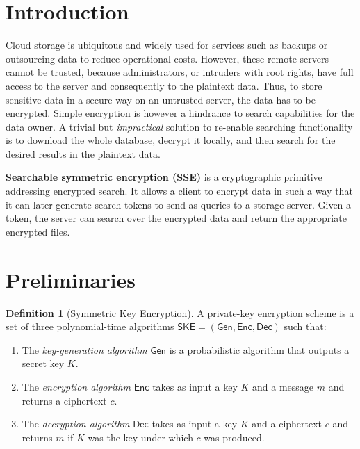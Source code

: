 \documentclass[12pt,a4paper]{article}
\theoremstyle{definition}
\newtheorem{definition}{Definition}
\begin{document}





\tableofcontents
\clearpage

\section{Introduction}

Cloud storage is ubiquitous and widely used for services such as backups or
outsourcing data to reduce operational costs. However, these remote servers
cannot be trusted, because administrators, or intruders with root rights, have
full access to the server and consequently to the plaintext data. Thus, to
store sensitive data in a secure way on an untrusted server, the data has to be
encrypted. Simple encryption is however a hindrance to search capabilities for
the data owner. A trivial but \emph{impractical} solution to re-enable
searching functionality is to download the whole database, decrypt it locally,
and then search for the desired results in the plaintext data.

\textbf{Searchable symmetric encryption (SSE)} is a cryptographic primitive
addressing encrypted search. It allows a client to encrypt data in such a
way that it can later generate search tokens to send as queries to a storage
server. Given a token, the server can search over the encrypted data and return
the appropriate encrypted files.
\clearpage

\section{Preliminaries}

\begin{definition}[Symmetric Key Encryption]
A private-key encryption scheme is a set of three polynomial-time algorithms
\(\mathsf{SKE = (Gen, Enc, Dec)}\) such that:
\begin{enumerate}
\item The \emph{key-generation algorithm} \(\mathsf{Gen}\) is a probabilistic
	algorithm that outputs a secret key \(K\).
\item The \emph{encryption algorithm} \(\mathsf{Enc}\) takes as input a key
	\(K\) and a message \(m\) and returns a ciphertext \(c\).
\item The \emph{decryption algorithm} \(\mathsf{Dec}\) takes as input a key
	\(K\) and a ciphertext \(c\) and returns \(m\) if \(K\) was the key
	under which \(c\) was produced.
\end{enumerate}
\end{definition}
\end{document}
